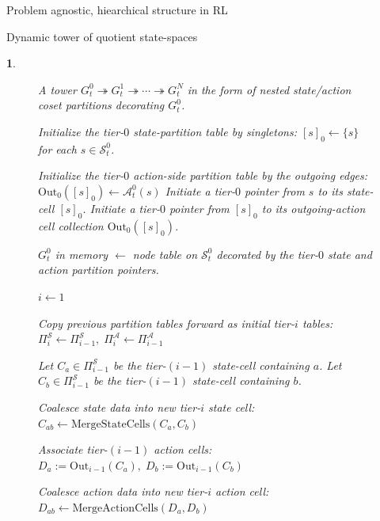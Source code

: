 \documentclass[11pt]{article}
\newtheorem{ermark}[subsubsection]{}
\begin{document}
\begin{section}{Problem agnostic, hiearchical structure in RL}
\begin{subsection}{Dynamic tower of quotient state-spaces}
\begin{ermark}
\begin{figure}[!h]
\begin{algorithm}[H]
\begin{algorithmic}[1]
\Ensure
A tower $G_t^0 \twoheadrightarrow G_t^1 \twoheadrightarrow \cdots \twoheadrightarrow G_t^N$ in the form of nested state/action coset partitions decorating $G_t^0$.

\Statex




    \State Initialize the tier-$0$ state-partition table by singletons:
    $
    [s]_0 \gets \{s\}
    $
    for each $s\in\mathcal{S}_t^0$.

    \State Initialize the tier-$0$ action-side partition table by the outgoing edges:
    $
    \mathrm{Out}_0([s]_0)\gets \mathcal{A}_t^0(s)
    $
        \State Initiate a tier-$0$ pointer from $s$ to its state-cell $[s]_0$.
        \State Initiate a tier-$0$ pointer from $[s]_0$ to its outgoing-action cell collection $\mathrm{Out}_0([s]_0)$.
    \EndFor

    \State $G_t^0$ in memory $\gets$ node table on $\mathcal{S}_t^0$ decorated by the tier-$0$ state and action partition pointers.

    \State $i \gets 1$

        \State Copy previous partition tables forward as initial tier-$i$ tables:
        $
        \Pi_i^{\mathcal S}\gets \Pi_{i-1}^{\mathcal S},
        \;
        \Pi_i^{\mathcal A}\gets \Pi_{i-1}^{\mathcal A}
        $

            \State Let $C_a\in\Pi_{i-1}^{\mathcal S}$ be the tier-$(i-1)$ state-cell containing $a$.
            \State Let $C_b\in\Pi_{i-1}^{\mathcal S}$ be the tier-$(i-1)$ state-cell containing $b$.

                \State Coalesce state data into new tier-$i$ state cell:
                $
                C_{ab}\gets \mathrm{MergeStateCells}(C_a,C_b)
                $

                \State  Associate tier-$(i-1)$ action cells: $D_a:=\mathrm{Out}_{i-1}(C_a),\;D_b:=\mathrm{Out}_{i-1}(C_b)$

                \State Coalesce action data into new tier-$i$ action cell:
                $
                D_{ab}\gets \mathrm{MergeActionCells}(D_a,D_b)
                $
                

\end{algorithmic}
\end{algorithm}
\end{figure}
\end{ermark}
\end{subsection}
\end{section}
\end{document}
